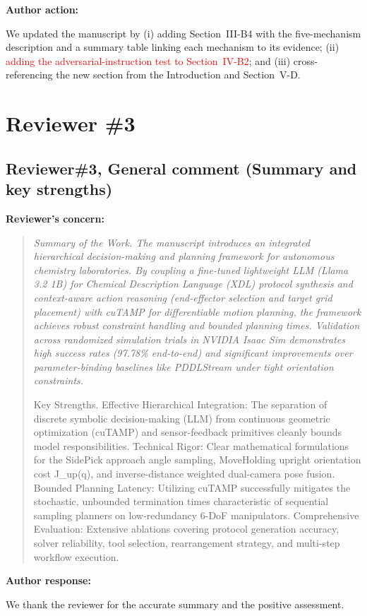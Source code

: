 \documentclass[11pt]{article}
\newcommand{\nd}[1]{\textcolor{red}{#1}}
\newif\ifshowstatus
\newcommand{\statusline}[2]{\ifshowstatus\par\noindent\textcolor{status#1}{\textbf{Status: \MakeUppercase{#1}.} #2}\par\smallskip\fi}
\newcommand{\reviewer}[1]{\clearpage\section*{#1}}
\newenvironment{concern}[3][pending]{\subsection*{\ifshowstatus\textcolor{status#1}{#2}\else#2\fi}\statusline{#1}{#3}\textbf{Reviewer's concern:}\begin{quote}\itshape}{\end{quote}}
\newenvironment{response}{\textbf{Author response:}\par\smallskip}{\par\medskip}
\newenvironment{action}{\textbf{Author action:}\par\smallskip}{\par\bigskip\noindent\hrulefill\par\bigskip}
\begin{document}
\begin{action}
We updated the manuscript by
(i) adding Section~III-B4 with the five-mechanism description and a summary table linking each mechanism to its evidence;
(ii) \nd{adding the adversarial-instruction test to Section~IV-B2};
and (iii) cross-referencing the new section from the Introduction and Section~V-D.
\end{action}

\reviewer{Reviewer \#3}

\begin{concern}[complete]{Reviewer\#3, General comment (Summary and key strengths)}{Acknowledgement only.}
Summary of the Work.
The manuscript introduces an integrated hierarchical decision-making and planning framework for autonomous chemistry laboratories.
By coupling a fine-tuned lightweight LLM (Llama 3.2 1B) for Chemical Description Language (XDL) protocol synthesis and context-aware action reasoning (end-effector selection and target grid placement) with cuTAMP for differentiable motion planning, the framework achieves robust constraint handling and bounded planning times.
Validation across randomized simulation trials in NVIDIA Isaac Sim demonstrates high success rates (97.78\% end-to-end) and significant improvements over parameter-binding baselines like PDDLStream under tight orientation constraints.

Key Strengths.
Effective Hierarchical Integration: The separation of discrete symbolic decision-making (LLM) from continuous geometric optimization (cuTAMP) and sensor-feedback primitives cleanly bounds model responsibilities.
Technical Rigor: Clear mathematical formulations for the SidePick approach angle sampling, MoveHolding upright orientation cost J\_up(q), and inverse-distance weighted dual-camera pose fusion.
Bounded Planning Latency: Utilizing cuTAMP successfully mitigates the stochastic, unbounded termination times characteristic of sequential sampling planners on low-redundancy 6-DoF manipulators.
Comprehensive Evaluation: Extensive ablations covering protocol generation accuracy, solver reliability, tool selection, rearrangement strategy, and multi-step workflow execution.
\end{concern}

\begin{response}
We thank the reviewer for the accurate summary and the positive assessment.
\end{response}
\end{document}
